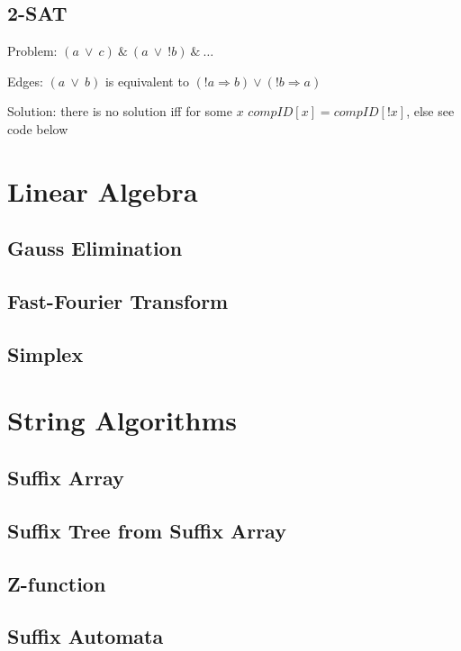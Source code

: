 \documentclass[10pt]{article}
\begin{document}
\subsection{2-SAT}
Problem: $(a ~ \vee ~ c) ~ \& ~ (a ~ \vee ~ !b) ~\& ~\ldots$

Edges: $(a ~ \vee ~ b)$ is equivalent to $(!a \Rightarrow b) \vee (!b \Rightarrow a)$

Solution: there is no solution iff for some $x$ $compID[x] = compID[!x]$, else see code below




\newpage
\section{Linear Algebra}
\subsection{Gauss Elimination}

\subsection{Fast-Fourier Transform}

\subsection{Simplex}




\newpage
\section{String Algorithms}
\subsection{Suffix Array}

\subsection{Suffix Tree from Suffix Array}

\subsection{Z-function}

\subsection{Suffix Automata}

\end{document}
